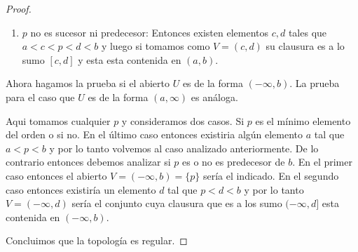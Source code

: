 \documentclass[paper=letter, fontsize=11pt]{scrartcl} %
\numberwithin{equation}{section} %
\numberwithin{figure}{section} %
\numberwithin{table}{section} %
\begin{document}
\begin{enumerate}
\begin{proof}
\begin{enumerate}
\item $ p $ no es sucesor ni predecesor: Entonces existen elementos $ c,d $ tales que $ a<c<p<d<b $ y luego si tomamos como $ V = (c,d) $ su clausura es a lo sumo $ [c,d] $ y esta esta contenida en $ (a,b) $.
\end{enumerate}

Ahora hagamos la prueba si el abierto $ U $ es de la forma $ (-\infty,b)  $. La prueba para el caso que $ U $ es de la forma $ (a,\infty) $ es análoga.

Aqui tomamos cualquier $ p $ y consideramos dos casos. Si $ p $ es el mínimo elemento del orden o si no. En el último caso entonces existiria algún elemento $ a $ tal que $ a < p < b $ y por lo tanto volvemos al caso analizado anteriormente. 
De lo contrario entonces debemos analizar si $ p $ es o no es predecesor de $ b $. En el primer caso entonces el abierto $ V = (-\infty,b) = \{p\} $ sería el indicado. En el segundo caso entonces existiría un elemento $ d $ tal que $ p<d<b $ y por lo tanto  $ V = (-\infty,d) $ sería el conjunto cuya clausura que es a los sumo $ (-\infty,d] $ esta contenida en $ (-\infty,b) $.

Concluimos que la topología es regular.
\end{proof}
\end{enumerate}
\end{document}
